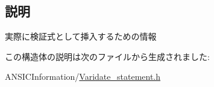 \subsection{説明}
実際に検証式として挿入するための情報 

この構造体の説明は次のファイルから生成されました:\begin{DoxyCompactItemize}
\item 
ANSICInformation/\hyperlink{Varidate__statement_8h}{Varidate\_\-statement.h}\end{DoxyCompactItemize}
